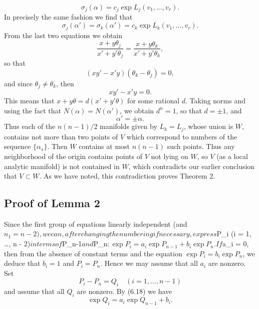 \documentclass{article}
\begin{document}
\begin{equation}
\sigma_j(\alpha) = c_j \exp L_j(v_1, \ldots, v_r).
\end{equation}
In precisely the same fashion we find that
\begin{equation}
\sigma_j(\alpha') = \sigma_k(\alpha') = c_k \exp L_k(v_1, \ldots, v_r).
\end{equation}
From the last two equations we obtain
\begin{equation}
\frac{x + y \theta_j}{x' + y' \theta_j} = \frac{x + y \theta_k}{x' + y' \theta_k},
\end{equation}
so that
\begin{equation}
(xy' - x'y)(\theta_k - \theta_j) = 0,
\end{equation}
and since $\theta_j \neq \theta_k$, then
\begin{equation}
xy' - x'y = 0.
\end{equation}
This means that $x + y \theta = d(x' + y' \theta)$ for some rational $d$. Taking norms and 
using the fact that $N(\alpha) = N(\alpha')$, we obtain $d^n = 1$, so that $d = \pm 1$, and
\begin{equation}
\alpha' = \pm \alpha.
\end{equation}
Thus each of the $n(n-1)/2$ manifolds given by $L_k = L_j$, whose union is $W$, contains not 
more than two points of $V$ which correspond to numbers of the sequence $\{\alpha_s\}$. Then 
$W$ contains at most $n(n-1)$ such points. Thus any neighborhood of the origin contains points 
of $V$ not lying on $W$, so $V$ (as a local analytic manifold) is not contained in $W$, which 
contradicts our earlier conclusion that $V \subset W$. As we have noted, this contradiction 
proves Theorem 2.

\subsection*{Proof of Lemma 2}
Since the first group of equations linearly independent (and $n_1 = n - 2), we can, after 
changing the numbering if necessary, express $\exp P_i (i = 1, \ldots, n - 2)$ in terms of 
$\exp P_{n-1}$ and $\exp P_n$:
\begin{equation}
\exp P_i = a_i \exp P_{n-1} + b_i \exp P_n.
\end{equation}
If $a_i = 0, then from the absence of constant terms and the equation $\exp P_i = b_i \exp P_n$, 
we deduce that $b_i = 1$ and $P_i = P_n$. Hence we may assume that all $a_i$ are nonzero. Set
\begin{equation}
P_i - P_n = Q_i \quad (i = 1, \ldots, n - 1)
\end{equation}
and assume that all $Q_i$ are nonzero. By (6.18) we have
\begin{equation}
\exp Q_i = a_i \exp Q_{n-1} + b_i.
\end{equation}
\end{document}

